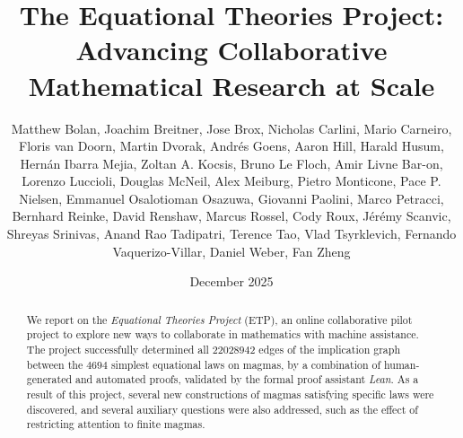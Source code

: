 \documentclass[12pt]{amsart}
\title[Equational Theories Project]{The Equational Theories Project: Advancing Collaborative Mathematical Research at Scale}
\author[Equational Theories Project contributors]{Matthew Bolan, Joachim Breitner, Jose Brox, Nicholas Carlini, Mario Carneiro, Floris van Doorn,
  Martin Dvorak, Andr\'es Goens, Aaron Hill, Harald Husum, Hern\'an Ibarra Mejia, Zoltan A. Kocsis, Bruno Le Floch, Amir Livne Bar-on, Lorenzo Luccioli, Douglas McNeil,
  Alex Meiburg, Pietro Monticone, Pace P. Nielsen, Emmanuel Osalotioman Osazuwa, Giovanni Paolini, Marco Petracci, Bernhard Reinke, David Renshaw, Marcus Rossel, Cody Roux,
  J\'er\'emy Scanvic, Shreyas Srinivas, Anand Rao Tadipatri, Terence Tao, Vlad Tsyrklevich, Fernando Vaquerizo-Villar,
  Daniel Weber, Fan Zheng}
\date{December 2025}
\theoremstyle{definition}
\begin{document}
\begin{abstract}
  We report on the \emph{Equational Theories Project} (ETP), an online collaborative pilot project
  to explore new ways to collaborate in mathematics with machine assistance. The project successfully determined all $\num{22028942}$ edges of the implication graph between the $4694$ simplest equational laws on magmas, by a combination of
  human-generated and automated proofs, validated by the formal proof assistant
  \emph{Lean}. As a result of this project, several new constructions of magmas satisfying specific laws were discovered, and several auxiliary questions were also addressed, such as the effect of restricting attention to finite magmas.
\end{abstract}

\begingroup
\def\uppercasenonmath#1{} %
\let\MakeUppercase\relax %
\maketitle
\endgroup

{
\setlength{\parskip}{0em}
\setcounter{tocdepth}{1}
\tableofcontents
}















\appendix
{}
\raggedbottom






\end{document}
